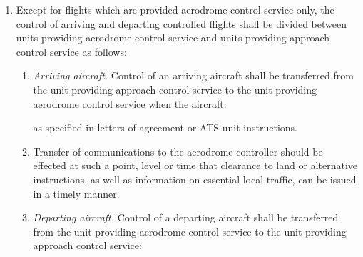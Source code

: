 \begin{enumerate}
    \item Except for flights which are provided aerodrome control service only, the control of arriving and departing controlled flights shall be divided between units providing aerodrome control service and units providing approach control service as follows:
    
    \begin{enumerate}
        \item \textit{Arriving aircraft.} Control of an arriving aircraft shall be transferred from the unit providing approach control service to the unit providing aerodrome control service when the aircraft:
        
        
        \noindent as specified in letters of agreement or ATS unit instructions.
        
        \item \label{4.3.2.1.2} Transfer of communications to the aerodrome controller should be effected at such a point, level or time that clearance to land or alternative instructions, as well as information on essential local traffic, can be issued in a timely manner.
        
        \item \textit{Departing aircraft.} Control of a departing aircraft shall be transferred from the unit providing aerodrome control service to the unit providing approach control service:


\end{enumerate}
\end{enumerate}

